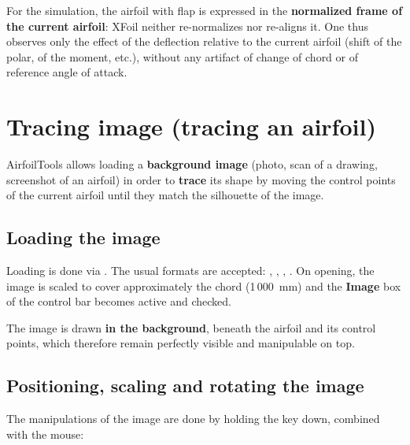 \begin{important}
For the simulation, the airfoil with flap is expressed in the
\textbf{normalized frame of the current airfoil}: XFoil neither
re-normalizes nor re-aligns it. One thus observes only the effect of
the deflection relative to the current airfoil (shift of the polar,
of the moment, etc.), without any artifact of change of chord or of
reference angle of attack.
\end{important}

\section{Tracing image (tracing an airfoil)}
\label{sec:calque}

AirfoilTools allows loading a \textbf{background image} (photo, scan
of a drawing, screenshot of an airfoil) in order to \textbf{trace}
its shape by moving the control points of the current airfoil until
they match the silhouette of the image.


\subsection{Loading the image}

Loading is done via . The usual formats are accepted: ,
, , . On opening, the image
is scaled to cover approximately the chord (1\,000~mm) and the
\textbf{Image} box of the control bar becomes active and checked.

The image is drawn \textbf{in the background}, beneath the airfoil
and its control points, which therefore remain perfectly visible and
manipulable on top.

\subsection{Positioning, scaling and rotating the image}

The manipulations of the image are done by holding the
 key down, combined with the mouse:

